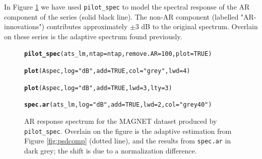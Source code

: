 \documentclass[10pt]{article}\usepackage[]{graphicx}\usepackage[]{color}
\makeatletter
\newcommand{\hlnum}[1]{\textcolor[rgb]{0.686,0.059,0.569}{#1}}%
\newcommand{\hlstr}[1]{\textcolor[rgb]{0.192,0.494,0.8}{#1}}%
\newcommand{\hlstd}[1]{\textcolor[rgb]{0.345,0.345,0.345}{#1}}%
\newcommand{\hlkwc}[1]{\textcolor[rgb]{0.333,0.667,0.333}{#1}}%
\newcommand{\hlkwd}[1]{\textcolor[rgb]{0.737,0.353,0.396}{\textbf{#1}}}%
\newenvironment{kframe}{%
 \def\at@end@of@kframe{}%
 \ifinner\ifhmode%
  \def\at@end@of@kframe{\end{minipage}}%
  \begin{minipage}{\columnwidth}%
 \fi\fi%
 \def\FrameCommand##1{\hskip\@totalleftmargin \hskip-\fboxsep
 \colorbox{shadecolor}{##1}\hskip-\fboxsep
     \hskip-\linewidth \hskip-\@totalleftmargin \hskip\columnwidth}%
 \MakeFramed {\advance\hsize-\width
   \@totalleftmargin\z@ \linewidth\hsize
   \@setminipage}}%
 {\par\unskip\endMakeFramed%
 \at@end@of@kframe}
\newenvironment{knitrout}{}{} %
\newcommand{\Rcmd}[1]{\texttt{#1}}
\makeatother
\begin{document}
In Figure \ref{fig:arspecvar} we have used \Rcmd{pilot\_spec} to 
model the spectral response of the AR component of the series (solid
black line).
The non-AR component (labelled "AR-innovations")
contributes approximately $\pm 3$ dB to the original spectrum.
Overlain on these series is the adaptive spectrum found previously.

\begin{figure}[h!]
\begin{center}
\begin{knitrout}
\color{fgcolor}\begin{kframe}
\begin{alltt}
\hlkwd{pilot_spec}\hlstd{(ats_lm,} \hlkwc{ntap}\hlstd{=ntap,} \hlkwc{remove.AR}\hlstd{=}\hlnum{100}\hlstd{,} \hlkwc{plot}\hlstd{=}\hlnum{TRUE}\hlstd{)}
\end{alltt}


{\ttfamily\noindent\itshape\color{messagecolor}{\#\# 1024 --> 1024}}

{\ttfamily\noindent\bfseries{}}\begin{alltt}
\hlkwd{plot}\hlstd{(Aspec,} \hlkwc{log}\hlstd{=}\hlstr{"dB"}\hlstd{,} \hlkwc{add}\hlstd{=}\hlnum{TRUE}\hlstd{,} \hlkwc{col}\hlstd{=}\hlstr{"grey"}\hlstd{,} \hlkwc{lwd}\hlstd{=}\hlnum{4}\hlstd{)}
\end{alltt}


{\ttfamily\noindent\bfseries{}}\begin{alltt}
\hlkwd{plot}\hlstd{(Aspec,} \hlkwc{log}\hlstd{=}\hlstr{"dB"}\hlstd{,} \hlkwc{add}\hlstd{=}\hlnum{TRUE}\hlstd{,} \hlkwc{lwd}\hlstd{=}\hlnum{3}\hlstd{,} \hlkwc{lty}\hlstd{=}\hlnum{3}\hlstd{)}
\end{alltt}


{\ttfamily\noindent\bfseries{}}\begin{alltt}
\hlkwd{spec.ar}\hlstd{(ats_lm,} \hlkwc{log}\hlstd{=}\hlstr{"dB"}\hlstd{,} \hlkwc{add}\hlstd{=}\hlnum{TRUE}\hlstd{,} \hlkwc{lwd}\hlstd{=}\hlnum{2}\hlstd{,} \hlkwc{col}\hlstd{=}\hlstr{"grey40"}\hlstd{)}
\end{alltt}


{\ttfamily\noindent\bfseries\color{errorcolor}{\#\# Error in plot.xy(xy.coords(x, y), type = type, ...): plot.new has not been called yet}}\end{kframe}
\end{knitrout}
\caption{AR response spectrum for the MAGNET dataset produced by 
\Rcmd{pilot\_spec}. Overlain on the figure is the adaptive estimation 
from Figure \ref{fig:psdcomp} (dotted line),
and the results from \Rcmd{spec.ar} in dark grey; the shift is due to a
normalization difference.}
\label{fig:arspecvar}
\end{center}
\end{figure}
\end{document}
